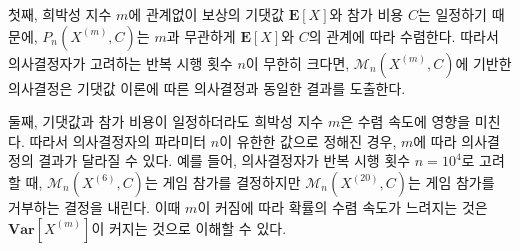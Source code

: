 첫째, 희박성 지수 $m$에 관계없이 보상의 기댓값 $\mathbf{E}[X]$와 참가 비용 $C$는 일정하기 때문에, $P_n(X^{(m)}, C)$는 $m$과 무관하게 $\mathbf{E}[X]$와 $C$의 관계에 따라 수렴한다. 따라서 의사결정자가 고려하는 반복 시행 횟수 $n$이 무한히 크다면, $\mathcal{M}_n(X^{(m)}, C)$에 기반한 의사결정은 기댓값 이론에 따른 의사결정과 동일한 결과를 도출한다.

둘째, 기댓값과 참가 비용이 일정하더라도 희박성 지수 $m$은 수렴 속도에 영향을 미친다. 따라서 의사결정자의 파라미터 $n$이 유한한 값으로 정해진 경우, $m$에 따라 의사결정의 결과가 달라질 수 있다. 예를 들어, 의사결정자가 반복 시행 횟수 $n=10^4$로 고려할 때, $\mathcal{M}_n(X^{(6)}, C)$는 게임 참가를 결정하지만 $\mathcal{M}_n(X^{(20)}, C)$는 게임 참가를 거부하는 결정을 내린다. 이때 $m$이 커짐에 따라 확률의 수렴 속도가 느려지는 것은 $\mathbf{Var}[X^{(m)}]$이 커지는 것으로 이해할 수 있다.
